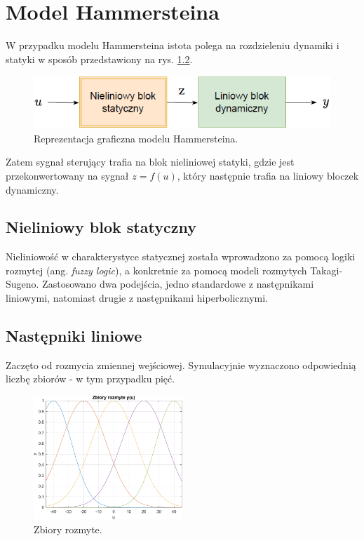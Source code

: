 \chapter{Model Hammersteina}
W przypadku modelu Hammersteina istota polega na rozdzieleniu dynamiki i statyki w sposób przedstawiony na rys. \ref{hamm_model}.

\begin{figure}[h!]
\centering
\includegraphics[width=\textwidth]{pictures/hamm_model}
\caption{Reprezentacja graficzna modelu Hammersteina.}
\label{hamm_model}
\end{figure}

\noindent Zatem sygnał sterujący trafia na blok nieliniowej statyki, gdzie jest przekonwertowany na sygnał $z = f(u)$, który następnie trafia na liniowy bloczek dynamiczny. 

\section{Nieliniowy blok statyczny}
Nieliniowość w charakterystyce statycznej została wprowadzono za pomocą logiki rozmytej (ang. \textit{fuzzy logic}), a konkretnie za pomocą modeli rozmytych Takagi-Sugeno. Zastosowano dwa podejścia, jedno standardowe z następnikami liniowymi, natomiast drugie z następnikami hiperbolicznymi.

\section{Następniki liniowe}
Zaczęto od rozmycia zmiennej wejściowej. Symulacyjnie wyznaczono odpowiednią liczbę zbiorów - w tym przypadku pięć.

\begin{figure}[h!]
\centering
\includegraphics[width=0.5\textwidth]{pictures/fuzzy_set_ham}
\caption{Zbiory rozmyte.}
\label{hamm_model}
\end{figure}

